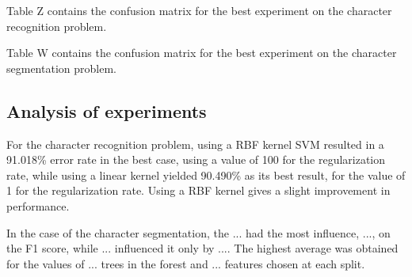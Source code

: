Table Z contains the confusion matrix for the best experiment on the character recognition problem.

Table W contains the confusion matrix for the best experiment on the character segmentation problem.

\subsection{Analysis of experiments}
For the character recognition problem, using a RBF kernel SVM resulted in a 91.018\%  error rate in the best case, using a value of 100 for the regularization rate, while using a linear kernel yielded 90.490\%  as its best result, for the value of 1 for the regularization rate. Using a RBF kernel gives a slight improvement in performance. 

In the case of the character segmentation, the ... had the most influence, ..., on the F1 score, while ... influenced it only by .... The highest average was obtained for the values of ... trees in the forest and ... features chosen at each split. 